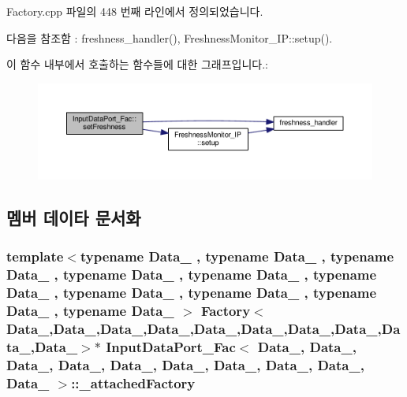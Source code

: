 Factory.\+cpp 파일의 448 번째 라인에서 정의되었습니다.



다음을 참조함 \+:  freshness\+\_\+handler(), Freshness\+Monitor\+\_\+\+I\+P\+::setup().



이 함수 내부에서 호출하는 함수들에 대한 그래프입니다.\+:\nopagebreak
\begin{figure}[H]
\begin{center}
\leavevmode
\includegraphics[width=350pt]{classInputDataPort__Fac_a57bb915c4c801305df78d70e3bcb8d5e_cgraph}
\end{center}
\end{figure}




\subsection{멤버 데이타 문서화}
\subsubsection[{\texorpdfstring{\+\_\+attached\+Factory}{_attachedFactory}}]{\setlength{\rightskip}{0pt plus 5cm}template$<$typename Data\+\_ , typename Data\+\_ , typename Data\+\_ , typename Data\+\_ , typename Data\+\_ , typename Data\+\_ , typename Data\+\_ , typename Data\+\_ , typename Data\+\_ , typename Data\+\_ $>$ {\bf Factory}$<$Data\+\_,Data\+\_,Data\+\_,Data\+\_,Data\+\_,Data\+\_,Data\+\_,Data\+\_,Data\+\_,Data\+\_$>$$\ast$ {\bf Input\+Data\+Port\+\_\+\+Fac}$<$ Data\+\_, Data\+\_, Data\+\_, Data\+\_, Data\+\_, Data\+\_, Data\+\_, Data\+\_, Data\+\_, Data\+\_ $>$\+::\+\_\+attached\+Factory\hspace{0.3cm}{\ttfamily [private]}}\hypertarget{classInputDataPort__Fac_a5978d61d3b32c4610a102e44179ce3c5}{}\label{classInputDataPort__Fac_a5978d61d3b32c4610a102e44179ce3c5}


